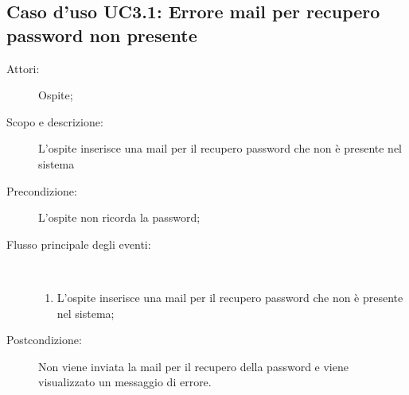 \subsection{Caso d'uso UC3.1: Errore mail per recupero password non presente}\begin{description}
	\item[Attori:] Ospite;
	\item[Scopo e descrizione:] L'ospite inserisce una mail per il recupero password che non è presente nel sistema
	\item[Precondizione:] L'ospite non ricorda la password;
	
	\item[Flusso principale degli eventi:] \ 
	\begin{enumerate}
		\item L'ospite inserisce una mail per il recupero password che non è presente nel sistema;
		
	\end{enumerate}
	\item[Postcondizione:] Non viene inviata la mail per il recupero della password e viene visualizzato un messaggio di errore.
\end{description}
\hypertarget{UC4}{}
